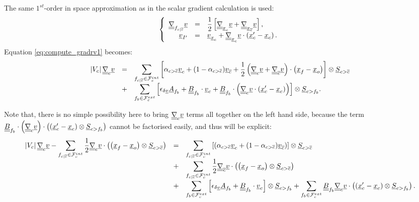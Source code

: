 The same $1^{st}$-order in space approximation as in the scalar gradient calculation is used:
\begin{equation*}
\left\{\begin{array}{r c l}
\gradt_{\fij} \variav & = & \displaystyle \dfrac{1}{2}\left[ \gradt_{\centi} \variav + \gradt_{\centj} \variav \right],\\
\variav_{\ipf} &= & \variav_{\centi} + \gradt_{\centi} \variav \cdot \left(\centip - \centi\right) .
\end{array}\right .
\end{equation*}
Equation \eqref{eq:compute_gradrv1} becomes:
%
\begin{equation*}
\begin{array}{r c l}
\norm{\vol{\celli}} \gradt_{\celli} \variav &=&
\displaystyle
\sum\limits_{\fij \in \Facei{\celli}}
\left[\alpha_{\bij} \variav_{\celli}
+ (1 - \alpha_{\bij}) \variav_{\cellj}  + \frac{1}{2}
\left( \gradt_{\celli} \variav +\gradt_{\cellj} \variav \right) \cdot \left(\centf - \cento\right)  \right] \otimes {\vect S_{\bij}}\\
&+& \displaystyle
\sum\limits_{\fib \in \Faceb{\celli}}
\left[ \epsilon_{\delta \variav}\vect{A}_{\fib} +
\tens{B}_{\fib} \cdot \variav_{\celli} + \tens{B}_{\fib} \cdot \left( \gradt_{\celli} \variav \cdot \left(\centip - \centi\right) \right)
\right] \otimes \vect{S}_{\ib}.
\end{array}
\end{equation*}

Note that, there is no simple possibility here to bring
 $\gradt_\celli \variav$ terms all together on the left hand side, because the term
 $ \tens{B}_{\fib} \cdot \left( \gradt_{\celli} \variav \right) \cdot \left( \left(\centip - \centi\right)
\otimes \vect{S}_{\ib} \right)$ cannot be factorised easily, and thus will be explicit:
%
\begin{equation}\label{eq:gradrv_recontruit}
\begin{array}{r c l}
\displaystyle
\norm{\vol{\celli}} \gradt_{\celli} \variav -
\sum\limits_{ \fij \in \Facei{\celli}} \frac{1}{2} \gradt_{\celli} \variav \cdot \left( \left(\centf - \cento\right) \otimes \vect{S}_{\bij} \right)
&=&
\displaystyle
\sum\limits_{\fij \in \Facei{\celli}}\left[
(\alpha_{\bij} \variav_{\celli} + (1 - \alpha_{\bij}) \variav_{\cellj})\right] \otimes \vect{S}_{\bij} \\
&+&
\displaystyle
\sum\limits_{\fij \in \Facei{\celli}} \frac{1}{2} \gradt_{\cellj} \variav \cdot \left( \left(\centf - \cento\right) \otimes \vect{S}_{\bij} \right) \\
&+&
\displaystyle
\sum\limits_{\fib \in \Faceb{\celli}}\left[ \epsilon_{\delta \variav} \vect{A}_{\fib} + \tens{B}_{\fib} \cdot \variav_{\celli} \right] \otimes \vect{S}_{\ib}
+
\sum\limits_{ \fib \in \Faceb{\celli}} \tens{B}_{\fib} \gradt_{\celli} \variav \cdot \left( \left(\centip - \centi\right)  \otimes \vect{S}_{\ib} \right)
.
\end{array}
\end{equation}

